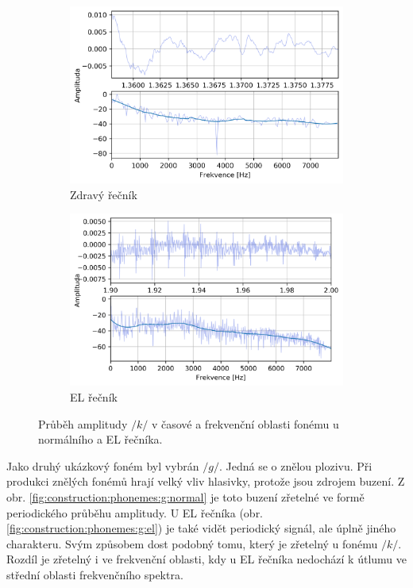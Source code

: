 \begin{figure}[htpb]
  \centering
  \begin{subfigure}[b]{0.45\textwidth}
    \includegraphics[width=\textwidth]{./ch5-construction/img/signal-normal_k.png}
    \caption{Zdravý řečník}
    \label{fig:construction:phonemes:k:normal}
  \end{subfigure}
  \begin{subfigure}[b]{0.45\textwidth}
    \includegraphics[width=\textwidth]{./ch5-construction/img/signal-el_k.png}
    \caption{EL řečník}
    \label{fig:construction:phonemes:k:el}
  \end{subfigure}
  \caption{Průběh amplitudy $/k/$ v časové a frekvenční oblasti fonému u normálního a EL řečníka.}
  \label{fig:construction:phonemes:k}
\end{figure}

Jako druhý ukázkový foném byl vybrán $/g/$.
Jedná se o znělou plozivu.
Při produkci znělých fonémů hrají velký vliv hlasivky, protože jsou zdrojem buzení.
Z obr. \ref{fig:construction:phonemes:g:normal} je toto buzení zřetelné ve formě periodického průběhu amplitudy.
U EL řečníka (obr. \ref{fig:construction:phonemes:g:el}) je také vidět periodický signál, ale úplně jiného charakteru.
Svým způsobem dost podobný tomu, který je zřetelný u fonému $/k/$.
Rozdíl je zřetelný i ve frekvenční oblasti, kdy u EL řečníka nedochází k útlumu ve střední oblasti frekvenčního spektra.


